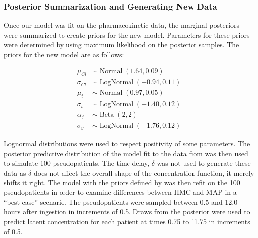 \subsubsection*{Posterior Summarization and Generating New Data}

Once our model was fit on the pharmacokinetic data, the marginal posteriors were summarized to create priors for the new model.  Parameters for these priors were determined by using maximum likelihood on the posterior samples.  The priors for the new model are as follows:

\begin{align}
	\mu_{\mathit{Cl}} &\sim \operatorname{Normal}(1.64, 0.09)  \label{eq:eq_18} \\
	\sigma_{\mathit{Cl}} &\sim \operatorname{LogNormal}(-0.94, 0.11)  \label{eq:eq_19} \\
	\mu_{t} &\sim \operatorname{Normal}(0.97, 0.05)   \label{eq:eq_20} \\
	\sigma_{t} &\sim \operatorname{LogNormal}(-1.40, 0.12)  \label{eq:eq_21} \\
	\alpha_j &\sim \operatorname{Beta}(2,2)  \label{eq:eq_22} \\
	\sigma_y &\sim \operatorname{LogNormal}(-1.76, 0.12)  \label{eq:eq_23}
\end{align}

\noindent Lognormal distributions were used to respect positivity of some parameters.  The posterior predictive distribution of the model fit to the data from \cite{Beaton2018-el} was then used to simulate 100  pseudopatients.  The time delay, $\delta$ was not used to generate these data as $\delta$ does not affect the overall shape of the concentration function, it merely shifts it right.  The model with the priors defined by  was then refit on the 100  pseudopatients in order to examine differences between HMC and MAP in a “best case” scenario. The pseudopatients were sampled between 0.5 and 12.0 hours after ingestion in increments of 0.5. Draws from the posterior were used to predict latent concentration for each patient at times 0.75 to 11.75 in increments of 0.5.